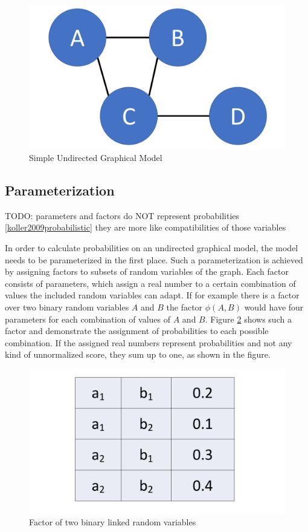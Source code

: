 \begin{figure}[htpb]
  \centering
  	\includegraphics[scale=0.3]{img/basic.pdf} 
  \caption{Simple Undirected Graphical Model}
  \label{fig:basic}
\end{figure}

\subsection{Parameterization}

TODO: parameters and factors do NOT represent probabilities \ref{koller2009probabilistic} they are more like compatibilities of those variables

In order to calculate probabilities on an undirected graphical model, the model needs to be parameterized in the first place. Such a parameterization is achieved by assigning factors to subsets of random variables of the graph. Each factor consists of parameters, which assign a real number to a certain combination of values the included random variables can adapt. If for example there is a factor over two binary random variables $A$ and $B$ the factor $\phi(A,B)$ would have four parameters for each combination of values of $A$ and $B$. Figure \ref{fig:param} shows such a factor and demonstrate the assignment of probabilities to each possible combination. If the assigned real numbers represent probabilities and not any kind of unnormalized score, they sum up to one, as shown in the figure.

\begin{figure}[htpb]
  \centering
  	\includegraphics[scale=0.3]{img/param.pdf} 
  \caption{Factor of two binary linked random variables}
  \label{fig:param}
\end{figure}

